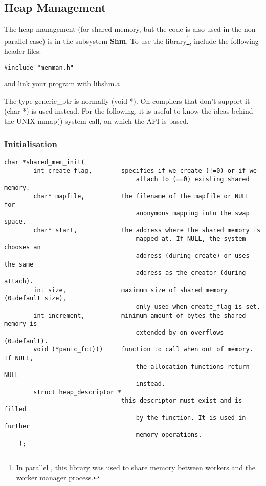 \subsection{Heap Management}

The heap management (for shared memory, but the code is also used
in the non-parallel case) is in the subsystem {\bf Shm}.
To use the library\footnote{
In parallel \eclipse, this library was used to share memory between
workers and the worker manager process.},
include the following header files:
\begin{verbatim}
#include "memman.h"
\end{verbatim}
and link your program with libshm.a

The type generic_ptr is normally (void *). On compilers that don't
support it (char *) is used instead.
For the following, it is useful to know the ideas behind the UNIX
mmap() system call, on which the API is based.

\subsubsection{Initialisation}

\begin{verbatim}
char *shared_mem_init(
        int create_flag,        specifies if we create (!=0) or if we
                                    attach to (==0) existing shared memory.
        char* mapfile,          the filename of the mapfile or NULL for
                                    anonymous mapping into the swap space.
        char* start,            the address where the shared memory is
                                    mapped at. If NULL, the system chooses an
                                    address (during create) or uses the same
                                    address as the creator (during attach).
        int size,               maximum size of shared memory (0=default size),
                                    only used when create_flag is set.
        int increment,          minimum amount of bytes the shared memory is
                                    extended by on overflows (0=default).
        void (*panic_fct)()     function to call when out of memory. If NULL,
                                    the allocation functions return NULL
                                    instead.
        struct heap_descriptor *
                                this descriptor must exist and is filled
                                    by the function. It is used in further
                                    memory operations.
    );
\end{verbatim}

